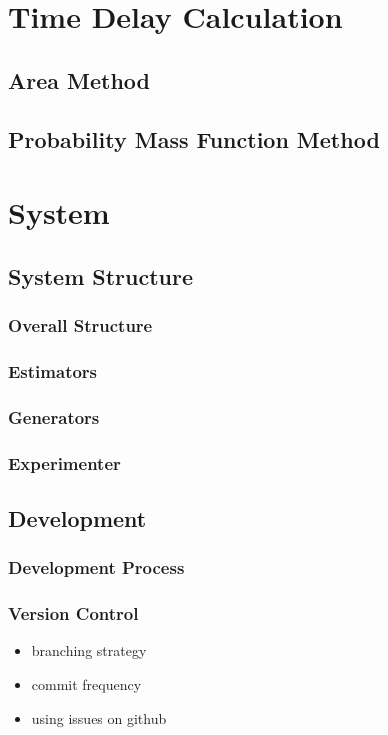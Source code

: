 \documentclass[a4paper,11pt]{article}
\begin{document}
\section{Time Delay Calculation}
\label{sec-5}
\subsection{Area Method}
\label{sec-5-1}
\subsection{Probability Mass Function Method}
\label{sec-5-2}
\section{System}
\label{sec-6}
\subsection{System Structure}
\label{sec-6-1}
\subsubsection{Overall Structure}
\label{sec-6-1-1}
\subsubsection{Estimators}
\label{sec-6-1-2}
\subsubsection{Generators}
\label{sec-6-1-3}
\subsubsection{Experimenter}
\label{sec-6-1-4}
\subsection{Development}
\label{sec-6-2}
\subsubsection{Development Process}
\label{sec-6-2-1}
\subsubsection{Version Control}
\label{sec-6-2-2}

\begin{itemize}
\item branching strategy
\item commit frequency
\item using issues on github
\end{itemize}
\end{document}
